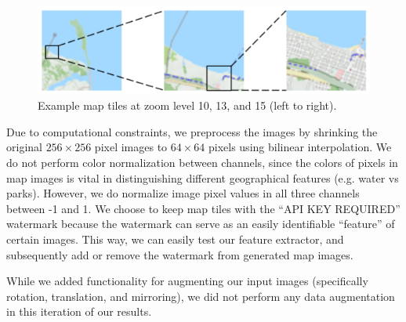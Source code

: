 \documentclass[11pt,twocolumn,letterpaper]{article}
\begin{document}
  \begin{figure}[H]
    \centering
        \includegraphics[width=\linewidth]{imgs/zoom.png}
        \caption{Example map tiles at zoom level 10, 13, and 15 (left to right).}
        \label{fig:zoom}
\end{figure}

Due to computational constraints, we preprocess the images by shrinking the original $256 \times 256$ pixel images to $64 \times 64$ pixels using bilinear interpolation. We do not perform color normalization between channels, since the colors of pixels in map images is vital in distinguishing different geographical features (e.g. water vs parks). However, we do normalize image pixel values in all three channels between -1 and 1. We choose to keep map tiles with the ``API KEY REQUIRED'' watermark because the watermark can serve as an easily identifiable ``feature'' of certain images. This way, we can easily test our feature extractor, and subsequently add or remove the watermark from generated map images.

While we added functionality for augmenting our input images (specifically rotation, translation, and mirroring), we did not perform any data augmentation in this iteration of our results.
\end{document}
